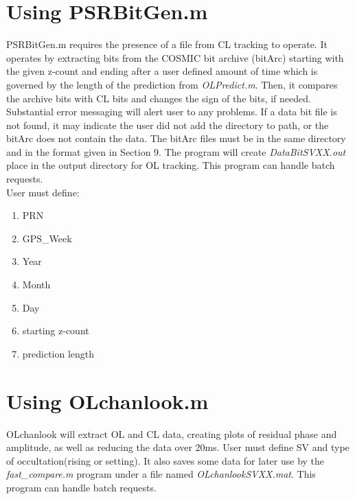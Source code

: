\documentclass[12pt,letterpaper,oneside]{report}
\begin{document}
\section{Using PSRBitGen.m}
PSRBitGen.m requires the presence of a file from CL tracking to operate. It operates by extracting bits from the COSMIC bit archive (bitArc) starting with the given z-count and ending after a user defined amount of time which is governed by the length of the prediction from \emph{OLPredict.m}. Then, it compares the archive bits with CL bits and changes the sign of the bits, if needed. Substantial error messaging will alert user to any problems. If a data bit file is not found, it may indicate the user did not add the directory to path, or the bitArc does not contain the data. The bitArc files must be in the same directory and in the format given in Section 9. The program will create \emph{DataBitSVXX.out} place in the output directory for OL tracking. This program can handle batch requests.\\
User must define:
\begin{enumerate}
\item PRN
\item GPS\_Week
\item Year
\item Month
\item Day
\item starting z-count
\item prediction length
\end{enumerate}

\section{Using OLchanlook.m}
{\indent\indent} OLchanlook will extract OL and CL data, creating plots of residual phase and amplitude, as well as reducing the data over 20ms. User must define SV and type of occultation(rising or setting). It also saves some data for later use by the \emph{fast\_compare.m} program under a file named \emph{OLchanlookSVXX.mat}. This program can handle batch requests.
\end{document}

